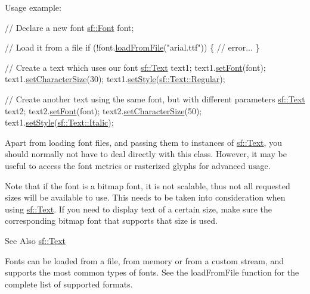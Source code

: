 Usage example\-: 
\begin{DoxyCode}
\textcolor{comment}{// Declare a new font}
\hyperlink{classsf_1_1_font}{sf::Font} font;

\textcolor{comment}{// Load it from a file}
\textcolor{keywordflow}{if} (!font.\hyperlink{classsf_1_1_font_ab020052ef4e01f6c749a85571c0f3fd1}{loadFromFile}(\textcolor{stringliteral}{"arial.ttf"}))
\{
    \textcolor{comment}{// error...}
\}

\textcolor{comment}{// Create a text which uses our font}
\hyperlink{classsf_1_1_text}{sf::Text} text1;
text1.\hyperlink{classsf_1_1_text_a2927805d1ae92d57f15034ea34756b81}{setFont}(font);
text1.\hyperlink{classsf_1_1_text_ae96f835fc1bff858f8a23c5b01eaaf7e}{setCharacterSize}(30);
text1.\hyperlink{classsf_1_1_text_ad791702bc2d1b6590a1719aa60635edf}{setStyle}(\hyperlink{classsf_1_1_text_aa8add4aef484c6e6b20faff07452bd82a65dbbdd9d938efe1eea1e2f3b7d7c944}{sf::Text::Regular});

\textcolor{comment}{// Create another text using the same font, but with different parameters}
\hyperlink{classsf_1_1_text}{sf::Text} text2;
text2.\hyperlink{classsf_1_1_text_a2927805d1ae92d57f15034ea34756b81}{setFont}(font);
text2.\hyperlink{classsf_1_1_text_ae96f835fc1bff858f8a23c5b01eaaf7e}{setCharacterSize}(50);
text1.\hyperlink{classsf_1_1_text_ad791702bc2d1b6590a1719aa60635edf}{setStyle}(\hyperlink{classsf_1_1_text_aa8add4aef484c6e6b20faff07452bd82af3e10eb0fa68aa746fbbdfcecbf352c9}{sf::Text::Italic});
\end{DoxyCode}


Apart from loading font files, and passing them to instances of \hyperlink{classsf_1_1_text}{sf\-::\-Text}, you should normally not have to deal directly with this class. However, it may be useful to access the font metrics or rasterized glyphs for advanced usage.

Note that if the font is a bitmap font, it is not scalable, thus not all requested sizes will be available to use. This needs to be taken into consideration when using \hyperlink{classsf_1_1_text}{sf\-::\-Text}. If you need to display text of a certain size, make sure the corresponding bitmap font that supports that size is used.

\begin{DoxySeeAlso}{See Also}
\hyperlink{classsf_1_1_text}{sf\-::\-Text}
\end{DoxySeeAlso}
Fonts can be loaded from a file, from memory or from a custom stream, and supports the most common types of fonts. See the load\-From\-File function for the complete list of supported formats.


